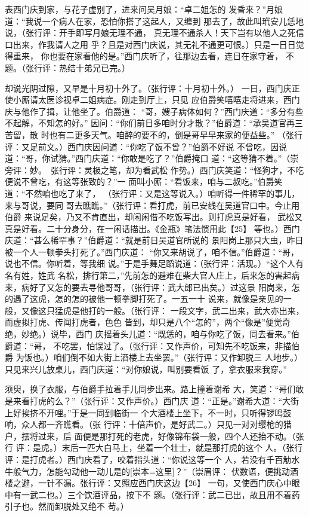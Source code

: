 \documentclass[UTF8,scheme=chinese,11pt,linespread=1.4]{ctexbook}
\makeatletter
\newcommand{\banben}[2][]{#2}
\newenvironment{diben}[1]
  {\list{}{\listparindent 2em
    \itemindent\listparindent
    \rightmargin 0em  %
    \leftmargin 0em  %
    \parsep \z@ \@plus\p@}%
   \item\relax}
  {\endlist}
\makeatother
\begin{document}
\begin{diben}
却表西门庆到家，与花子虚别了，进来问吴月娘：“卓二姐怎的
发昏来？”月娘道：“我说一个病人在家，恐怕你搭了这起人，又缠到
那去了，故此叫玳安儿恁地说，（张行评：开手即写月娘无理不通，
真无理不通杀人！天下岂有以他人之死信口出来，作我请人之用
乎？且是对西门庆说，其无礼不通更可恨。）只是一日日觉得重来，
你也要在家看他的是。”西门庆听了，往那边去看，连日在家守着，
不题。（张行评：热结十弟兄已完。）

却说光阴过隙，又早是十月初十外了。（张行评：十月初十外。）
一日，西门庆正使小厮请太医诊视卓二姐病症。刚走到厅上，只见
应伯爵笑嘻嘻走将进来，西门庆与他作了揖，让他坐了。伯爵道：
“哥，嫂子病体如何？”西门庆道：“多分有些不起解，不知怎的好。”
因问：“你们前日多咱时分才散？”伯爵道：“承吴道官再三苦留，散
时也有二更多天气。咱醉的要不的，倒是哥早早来家的便益些。”
（张行评：又足前文。）西门庆因问道：“你吃了饭不曾？”伯爵不好说
不曾吃，因说道：“哥，你试猜。”西门庆道：“你敢是吃了？”伯爵掩口
道：“这等猜不着。”（崇旁评：妙。　张行评：灵极之笔，却为看武松
作势。）西门庆笑道：“怪狗才，不吃便说不曾吃，有这等张致的？”一
面叫小厮：“看饭来，咱与二叔吃。”伯爵笑道：“不然咱也吃了来了，
（张行评：又是这等说入。）咱听得一件稀罕的事儿，来与哥说，要同
哥去瞧瞧。”（张行评：看打虎，前已安线在吴道官口中。今止用伯爵
来说足矣，乃又不肯直出，却闲闲借不吃饭写出。则打虎真是好看，
武松又真是好看。二十分身分，在一闲话描出。《金瓶》笔法惯用此【25】
等也。）西门庆道：“甚么稀罕事？”伯爵道：“就是前日吴道官所说的
景阳岗上那只大虫，昨日被一个人一顿拳头打死了。”西门庆道：
“你又来胡说了，咱不信。”伯爵道：“哥，说也不信。你听着，等我细
说。”于是手舞足蹈说道：（张行评：活现。）“这个人有名有姓，姓武
名松，排行第二，”先前怎的避难在柴大官人庄上，后来怎的害起病
来，病好了又怎的要去寻他哥哥，（张行评：武大郎已出矣。）过这景
阳岗来，怎的遇了这虎，怎的怎的被他一顿拳脚打死了。一五一十
说来，就像是亲见的一般，又像这只猛虎是他打的一般。（张行评：
一段文字，武二出来，武大亦出来，而虚拟打虎、传闻打虎者，色色
皆到，却只是八个“怎的”，两个“像是”便觉奇绝，妙绝。）说毕，西门
庆摇着头儿道：“既恁的，咱与你吃了饭，同去看来。”伯爵道：“哥，
不吃罢，怕误过了。（张行评：又作声价，可知先不吃饭来，非描伯爵
为饭也。）咱们倒不如大街上酒楼上去坐罢。”（张行评：又作卸脱三
人地步。）只见来兴儿放桌儿，西门庆道：“对你娘说，叫别要看饭
了，拿衣服来我穿。”

须臾，换了衣服，与伯爵手拉着手儿同步出来。路上撞着谢希
大，笑道：“哥们敢是来看打虎的么？”（张行评：又作声价。）西门庆
道：“正是。”谢希大道：“大街上好挨挤不开哩。”于是一同到临街一
个大酒楼上坐下。不一时，只听得锣鸣鼓响，众人都一齐瞧看。（张
行评：十倍声价，是好武二。）只见一对对缨枪的猎户，摆将过来，后
面便是那打死的老虎，好像锦布袋一般，四个人还抬不动。（张行
评：是虎。）末后一匹大白马上，坐着一个壮士，就是那打虎的这个
人。（张行评：是打虎者。）西门庆看了，咬着指头道：“你说这等一个
人，若没有千百觔水牛般气力，怎能勾动他一动儿\banben{是的}[崇本={这里}]？”（崇眉评：
伏数语，便挑动酒楼之避，一针不漏。张行评：又照应西门庆这边【26】
一句，又使西门庆心中眼中有一武二也。）三个饮酒评品，按下不
题。（张行评：武二已出，故且用不着药引子也。然而卸脱处又绝不
苟。）


\end{diben}
\end{document}
